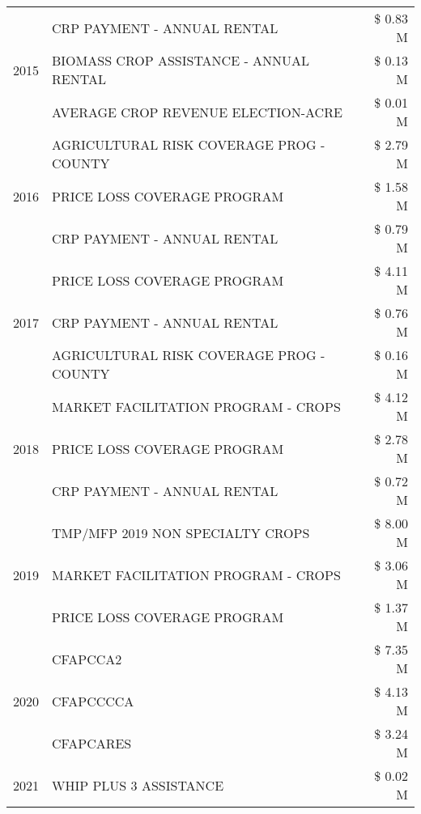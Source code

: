 \begin{tabular}{llr}
\multirow[t]{3}{*}{2015} & CRP PAYMENT - ANNUAL RENTAL & \$ 0.83 M \\
 & BIOMASS CROP ASSISTANCE - ANNUAL RENTAL & \$ 0.13 M \\
 & AVERAGE CROP REVENUE ELECTION-ACRE & \$ 0.01 M \\
\cline{1-3}
\multirow[t]{3}{*}{2016} & AGRICULTURAL RISK COVERAGE PROG - COUNTY & \$ 2.79 M \\
 & PRICE LOSS COVERAGE PROGRAM & \$ 1.58 M \\
 & CRP PAYMENT - ANNUAL RENTAL & \$ 0.79 M \\
\cline{1-3}
\multirow[t]{3}{*}{2017} & PRICE LOSS COVERAGE PROGRAM & \$ 4.11 M \\
 & CRP PAYMENT - ANNUAL RENTAL & \$ 0.76 M \\
 & AGRICULTURAL RISK COVERAGE PROG - COUNTY & \$ 0.16 M \\
\cline{1-3}
\multirow[t]{3}{*}{2018} & MARKET FACILITATION PROGRAM - CROPS & \$ 4.12 M \\
 & PRICE LOSS COVERAGE PROGRAM & \$ 2.78 M \\
 & CRP PAYMENT - ANNUAL RENTAL & \$ 0.72 M \\
\cline{1-3}
\multirow[t]{3}{*}{2019} & TMP/MFP 2019 NON SPECIALTY CROPS & \$ 8.00 M \\
 & MARKET FACILITATION PROGRAM - CROPS & \$ 3.06 M \\
 & PRICE LOSS COVERAGE PROGRAM & \$ 1.37 M \\
\cline{1-3}
\multirow[t]{3}{*}{2020} & CFAPCCA2 & \$ 7.35 M \\
 & CFAPCCCCA & \$ 4.13 M \\
 & CFAPCARES & \$ 3.24 M \\
\cline{1-3}
2021 & WHIP PLUS 3 ASSISTANCE & \$ 0.02 M \\
\cline{1-3}
\bottomrule
\end{tabular}

